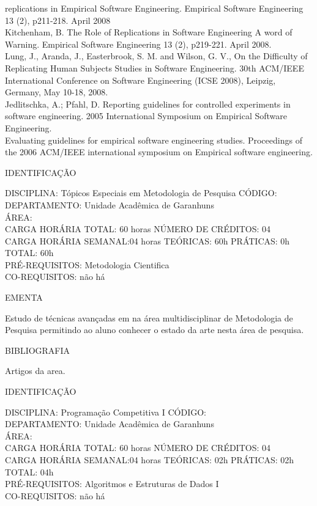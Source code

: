 \documentclass[
	12pt,				%
	openright,			%
  oneside,     %
	a4paper,			%
	english,			%
	french,				%
	spanish,			%
	brazil				%
	]{abntex2}
\begin{document}
\begin{apendicesenv}
replications in Empirical Software Engineering. Empirical Software
Engineering 13 (2), p211-218. April 2008 \\
Kitchenham, B. The Role of Replications in Software Engineering  A
word of Warning. Empirical Software Engineering 13 (2), p219-221. April
2008.\\
Lung, J., Aranda, J., Easterbrook, S. M. and Wilson, G. V., On the
Difficulty of Replicating Human Subjects Studies in Software
Engineering. 30th ACM/IEEE International Conference on Software
Engineering (ICSE 2008), Leipzig, Germany, May 10-18,
2008.\\
Jedlitschka, A.; Pfahl, D. Reporting guidelines for controlled
experiments in software engineering. 2005 International Symposium on
Empirical Software Engineering.\\
Evaluating guidelines for empirical software engineering studies.
Proceedings of the 2006 ACM/IEEE international symposium on Empirical
software engineering.

\newpage IDENTIFICAÇÃO

DISCIPLINA: Tópicos Especiais em Metodologia de Pesquisa CÓDIGO: \\
DEPARTAMENTO: Unidade Acadêmica de Garanhuns \\
ÁREA: \\
CARGA HORÁRIA TOTAL: 60 horas NÚMERO DE CRÉDITOS: 04\\
CARGA HORÁRIA SEMANAL:04 horas TEÓRICAS: 60h PRÁTICAS: 0h TOTAL: 60h\\
PRÉ-REQUISITOS: Metodologia Cientifica\\
CO-REQUISITOS: não há

EMENTA 

Estudo de técnicas avançadas em na área multidisciplinar de Metodologia
de Pesquisa permitindo ao aluno conhecer o estado da arte nesta área de
pesquisa.

BIBLIOGRAFIA 

Artigos da area.

\newpage IDENTIFICAÇÃO

DISCIPLINA: Programação Competitiva I CÓDIGO: \\
DEPARTAMENTO: Unidade Acadêmica de Garanhuns \\
ÁREA: \\
CARGA HORÁRIA TOTAL: 60 horas NÚMERO DE CRÉDITOS: 04\\
CARGA HORÁRIA SEMANAL:04 horas TEÓRICAS: 02h PRÁTICAS: 02h TOTAL: 04h\\
PRÉ-REQUISITOS: Algoritmos e Estruturas de Dados I\\
CO-REQUISITOS: não há


\end{apendicesenv}
\end{document}
